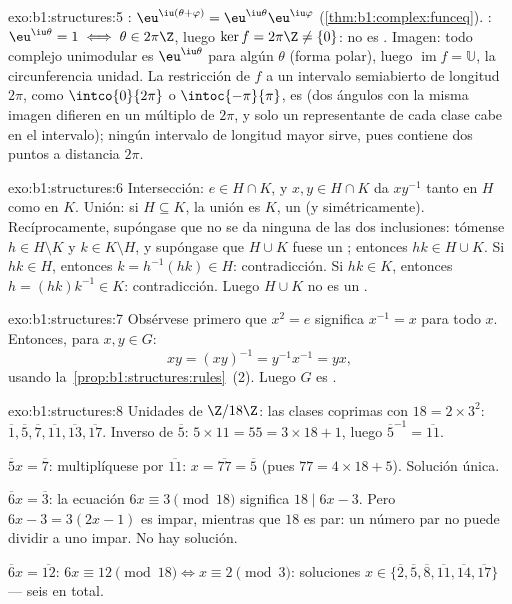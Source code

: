 \begin{solution}{exo:b1:structures:5}
: $\eu^{\iu(\theta + \varphi)} =
\eu^{\iu\theta}\eu^{\iu\varphi}$ (\cref{thm:b1:complex:funceq}).
: $\eu^{\iu\theta} = 1 \iff \theta \in 2\pi\Z$, luego
$\ker f = 2\pi\Z \neq \{0\}$: no es . Imagen: todo complejo
unimodular es $\eu^{\iu\theta}$ para algún $\theta$ (forma polar),
luego $\operatorname{im} f = \mathbb{U}$, la circunferencia unidad. La
restricción de $f$ a un intervalo semiabierto de longitud $2\pi$, como
$\intco{0}{2\pi}$ o $\intoc{-\pi}{\pi}$, es  (dos ángulos
con la misma imagen difieren en un múltiplo de $2\pi$, y solo un
representante de cada clase cabe en el intervalo); ningún intervalo de
longitud mayor sirve, pues contiene dos puntos a distancia $2\pi$.
\end{solution}

\begin{solution}{exo:b1:structures:6}
Intersección: $e \in H \cap K$, y $x, y \in H \cap K$ da $xy^{-1}$ tanto
en $H$ como en $K$. Unión: si $H \subseteq K$, la unión es $K$, un
 (y simétricamente). Recíprocamente, supóngase que no se da
ninguna de las dos inclusiones: tómense $h \in H \setminus K$ y
$k \in K \setminus H$, y supóngase que $H \cup K$ fuese un ;
entonces $hk \in H \cup K$. Si $hk \in H$, entonces
$k = h^{-1}(hk) \in H$: contradicción. Si $hk \in K$, entonces
$h = (hk)k^{-1} \in K$: contradicción. Luego $H \cup K$ no es un
.
\end{solution}

\begin{solution}{exo:b1:structures:7}
Obsérvese primero que $x^2 = e$ significa $x^{-1} = x$ para todo $x$.
Entonces, para $x, y \in G$:
\[
xy = (xy)^{-1} = y^{-1} x^{-1} = yx ,
\]
usando la~\cref{prop:b1:structures:rules}~(2). Luego $G$ es .
\end{solution}

\begin{solution}{exo:b1:structures:8}
Unidades de $\Z/18\Z$: las clases coprimas con $18 = 2 \times 3^2$:
$\overline 1, \overline 5, \overline 7, \overline{11}, \overline{13},
\overline{17}$. Inverso de $\overline 5$: $5 \times 11 = 55 = 3\times
18 + 1$, luego $\overline 5^{-1} = \overline{11}$.

$\overline 5 x = \overline 7$: multiplíquese por $\overline{11}$:
$x = \overline{77} = \overline 5$ (pues $77 = 4\times 18 + 5$).
Solución única.

$\overline 6 x = \overline 3$: la ecuación $6x \equiv 3 \pmod{18}$
significa $18 \mid 6x - 3$. Pero $6x - 3 = 3(2x - 1)$ es impar,
mientras que $18$ es par: un número par no puede dividir a uno impar.
No hay solución.

$\overline 6 x = \overline{12}$: $6x \equiv 12 \pmod{18} \iff x
\equiv 2 \pmod 3$: soluciones $x \in \{\overline 2, \overline 5,
\overline 8, \overline{11}, \overline{14}, \overline{17}\}$ --- seis
en total.
\end{solution}

